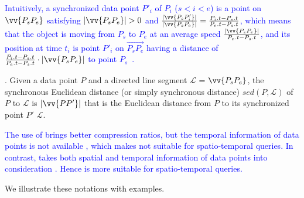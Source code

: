 \textcolor{blue}{Intuitively, a synchronized data point $P'_i$ of $P_i$ ($s<i<e$) is a point on $\vv{P_sP_{e}}$ satisfying $|\vv{P_sP_e}|>0$ and $\frac{|\vv{P_sP'_i}|}{|\vv{P_sP_e}|} = \frac{P_i.t - P_s.t}{P_e.t - P_s.t}$, which means that the object is moving from $P_s$ to $P_e$ at an average speed $\frac{|\vv{P_sP_e}|}{P_e.t-P_s.t}$, and its position at time $t_i$ is point $P'_i$ on $\overrightarrow{P_sP_{e}}$ having a distance of $\frac{P_i.t - P_s.t}{P_e.t - P_s.t}\cdot|\vv{P_sP_e}|$ to point $P_s$~\cite{Meratnia:Spatiotemporal, Chen:Fast, Zhang:Evaluation}.}

. Given a data point $P$ and a directed line segment $\mathcal{L}$ = $\vv{P_{s}P_{e}}$, the synchronous Euclidean distance (or simply synchronous distance) $sed(P, \mathcal{L})$ of $P$ to $\mathcal{L}$ is $|\vv{PP'}|$ that is the Euclidean distance from $P$ to its synchronized point $P'$ \wrt $\mathcal{L}$. %

\textcolor{blue}{The use of \ped brings better compression ratios, but the temporal information of data points is not available \cite{Meratnia:Spatiotemporal}, which makes \ped not suitable for spatio-temporal queries.}
\textcolor{blue}{In contrast, \sed takes both spatial and temporal information of data points into consideration \cite{Meratnia:Spatiotemporal}. Hence \sed is more suitable for spatio-temporal queries.}


We illustrate these notations with examples.


